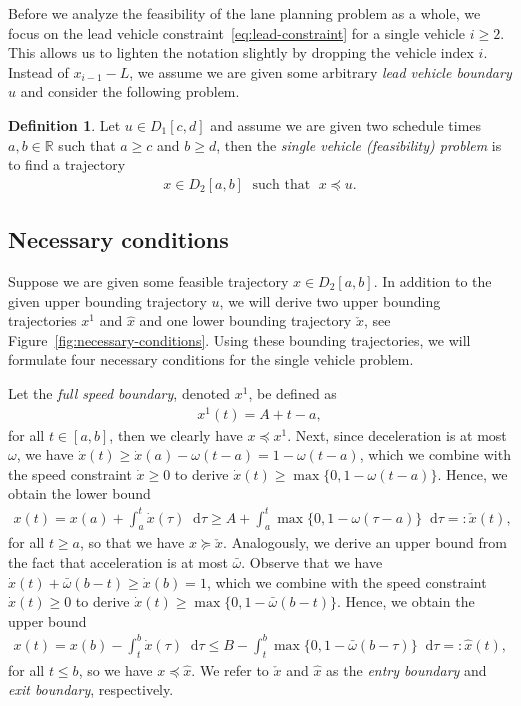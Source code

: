 \documentclass[a4paper]{article}
\theoremstyle{definition}
\newtheorem{define}{Definition\hspace{0.25em}\ignorespaces}
\theoremstyle{plain}
\newcommand*\diff{\mathop{}\!\mathrm{d}}
\begin{document}
Before we analyze the feasibility of the lane planning problem as a whole, we
focus on the lead vehicle constraint~\eqref{eq:lead-constraint} for a single
vehicle $i \geq 2$.
%
This allows us to lighten the notation slightly by dropping the vehicle index
$i$. Instead of $x_{i-1} - L$, we assume we are given some arbitrary \emph{lead vehicle boundary}
$u$ and consider the following problem.

\begin{define}
  Let $u \in D_{1}[c, d]$ and assume we are given two schedule times
  $a,b \in \mathbb{R}$ such that $a \geq c$ and $b \geq d$, then the
  \emph{single vehicle (feasibility) problem} is to find a trajectory
  \begin{align}
    x \in D_{2}[a,b] \; \text{ such that } \; x \preceq u .
  \end{align}
\end{define}

\subsection{Necessary conditions}

Suppose we are given some feasible trajectory $x \in D_{2}[a,b]$.
%
In addition to the given upper bounding trajectory $u$, we will derive two
upper bounding trajectories $x^{1}$ and $\hat{x}$ and one lower bounding
trajectory $\check{x}$, see Figure~\ref{fig:necessary-conditions}.
%
Using these bounding trajectories, we will formulate four necessary conditions
for the single vehicle problem.

Let the \emph{full speed boundary}, denoted $x^{1}$, be defined as
\begin{align}
  x^{1}(t) = A + t - a,
\end{align}
for all $t \in [a, b]$, then we clearly have $x \preceq x^{1}$.
%
Next, since deceleration is at most $\omega$, we have
$\dot{x}(t) \geq \dot{x}(a) - \omega(t - a) = 1 - \omega(t - a)$, which we
combine with the speed constraint $\dot{x} \geq 0$ to derive
$\dot{x}(t) \geq \max\{0, 1 - \omega (t - a) \}$. Hence, we obtain the lower
bound
\begin{align}\label{eq:check-x}
  x(t) = x(a) + \int_{a}^{t} \dot{x}(\tau) \diff \tau \geq A + \int_{a}^{t} \max\{0, 1 - \omega (\tau - a) \} \diff \tau =: \check{x}(t) ,
\end{align}
for all $t \geq a$, so that we have $x \succeq \check{x}$.
%
Analogously, we derive an upper bound from the fact that acceleration is at most $\bar{\omega}$. Observe that we have
$\dot{x}(t) + \bar{\omega} (b - t) \geq \dot{x}(b) = 1$, which we combine
with the speed constraint $\dot{x}(t) \geq 0$ to derive
$\dot{x}(t) \geq \max \{ 0, 1 - \bar{\omega}(b - t) \}$. Hence, we obtain the
upper bound
\begin{align}\label{eq:hat-x}
  x(t) = x(b) - \int_{t}^{b} \dot{x}(\tau) \diff \tau
  \leq B - \int_{t}^{b} \max\{ 0, 1 -\bar{\omega} (b - \tau) \} \diff \tau =: \hat{x}(t) ,
\end{align}
for all $t \leq b$, so we have $x \preceq \hat{x}$.
%
We refer to $\check{x}$ and $\hat{x}$ as the \emph{entry boundary} and
\emph{exit boundary}, respectively.
\end{document}
